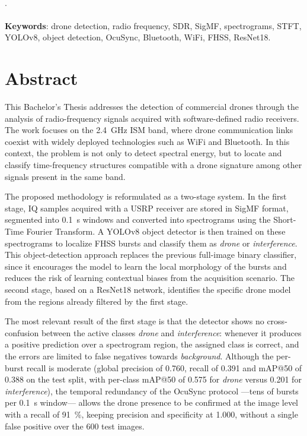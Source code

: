 
\thispagestyle{empty}


\noindent\textbf{\tfgtitulo}\\
\tfgsubtitulo.\\[0.4cm]

\noindent\tfgautor\\[0.6cm]

\noindent\textbf{Keywords}: drone detection, radio frequency, SDR, SigMF, spectrograms, STFT, YOLOv8, object detection, OcuSync, Bluetooth, WiFi, FHSS, ResNet18.

\vspace{0.6cm}
\section*{Abstract}

This Bachelor's Thesis addresses the detection of commercial drones through the analysis of radio-frequency signals acquired with software-defined radio receivers. The work focuses on the \SI{2.4}{\giga\hertz} ISM band, where drone communication links coexist with widely deployed technologies such as WiFi and Bluetooth. In this context, the problem is not only to detect spectral energy, but to locate and classify time-frequency structures compatible with a drone signature among other signals present in the same band.

The proposed methodology is reformulated as a two-stage system. In the first stage, IQ samples acquired with a USRP receiver are stored in SigMF format, segmented into \SI{0.1}{\second} windows and converted into spectrograms using the Short-Time Fourier Transform. A YOLOv8 object detector is then trained on these spectrograms to localize FHSS bursts and classify them as \emph{drone} or \emph{interference}. This object-detection approach replaces the previous full-image binary classifier, since it encourages the model to learn the local morphology of the bursts and reduces the risk of learning contextual biases from the acquisition scenario. The second stage, based on a ResNet18 network, identifies the specific drone model from the regions already filtered by the first stage.

The most relevant result of the first stage is that the detector shows no cross-confusion between the active classes \emph{drone} and \emph{interference}: whenever it produces a positive prediction over a spectrogram region, the assigned class is correct, and the errors are limited to false negatives towards \emph{background}. Although the per-burst recall is moderate (global precision of 0.760, recall of 0.391 and mAP@50 of 0.388 on the test split, with per-class mAP@50 of 0.575 for \emph{drone} versus 0.201 for \emph{interference}), the temporal redundancy of the OcuSync protocol ---tens of bursts per \SI{0.1}{\second} window--- allows the drone presence to be confirmed at the image level with a recall of \SI{91}{\percent}, keeping precision and specificity at 1.000, without a single false positive over the 600 test images.

